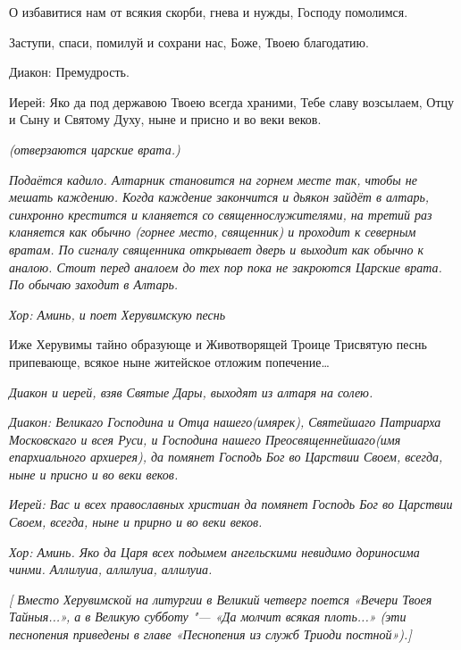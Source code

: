   О избавитися нам от всякия скорби, гнева и нужды, Господу помолимся. 


  Заступи, спаси, помилуй и сохрани нас, Боже, Твоею благодатию. \itshape 


  Диакон:\normalfont{} Премудрость. \itshape 


  Иерей:\normalfont{} Яко да под державою Твоею всегда храними, Тебе славу возсылаем, Отцу и Сыну и Святому Духу, ныне и присно и во веки веков. 


 \itshape (отверзаются царские врата.)\normalfont{}


 \itshape Подаётся кадило. Алтарник становится на горнем месте так, чтобы не мешать каждению. Когда каждение закончится и дьякон зайдёт в алтарь, синхронно крестится и кланяется со священнослужителями, на третий раз кланяется как обычно (горнее место, священник) и проходит к северным вратам. По сигналу священника открывает дверь и выходит как обычно к аналою. Стоит перед аналоем до тех пор пока не закроются Царские врата. По обычаю заходит в Алтарь\normalfont{}. 


\itshape  Хор:\normalfont{} Аминь, \itshape и поет Херувимскую песнь \normalfont{}




  Иже Херувимы тайно образующе и Животворящей Троице Трисвятую песнь припевающе, всякое ныне житейское отложим попечение… 




\itshape  Диакон и иерей, взяв Святые Дары, выходят из алтаря на солею.\normalfont{}


\itshape  Диакон:\normalfont{} Великаго Господина и Отца нашего\itshape  (имярек),\normalfont{} Святейшаго Патриарха Московскаго и всея Руси, и Господина нашего Преосвященнейшаго\itshape  (имя епархиального архиерея),\normalfont{} да помянет Господь Бог во Царствии Своем, всегда, ныне и присно и во веки веков.


\itshape  Иерей:\normalfont{} Вас и всех православных христиан да помянет Господь Бог во Царствии Своем, всегда, ныне и прирно и во веки веков.


\itshape Хор:\normalfont{} Аминь. Яко да Царя всех подымем ангельскими невидимо дориносима чинми. Аллилуиа, аллилуиа, аллилуиа.


 \itshape  [ Вместо Херувимской на литургии в Великий четверг поется \normalfont{}«Вечери Твоея Тайныя..\itshape .», а в Великую субботу "--- \normalfont{}«Да молчит всякая плоть..\itshape .» (эти песнопения приведены в главе «Песнопения из служб Триоди постной»).]\normalfont{}



